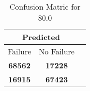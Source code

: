 \begin{table}[] 
\caption{Confusion Matric for 80.0} 
\label{Table: Prediction Accuracy-DMD80.0OnlySunEKF-ignoreReflection-Reflection} 
\centering 
\begin{tabular} 
 {@{}ccc@{}} 
\toprule 
\multicolumn{2}{c}{\textbf{Predicted}}
 \\ \midrule 
\multicolumn{1}{|c|}{Failure} & 
\multicolumn{1}{c|}{No Failure}
 \\ \midrule 
\multicolumn{1}{|c|}{\color{green}\textbf{68562}} & 
\multicolumn{1}{c|}{\color{red}\textbf{17228}}
 \\ \midrule 
\multicolumn{1}{|c|}{\color{red}\textbf{16915}} & 
\multicolumn{1}{c|}{\color{green}\textbf{67423}}
 \\ \bottomrule 
\end{tabular} 
\end{table} 
